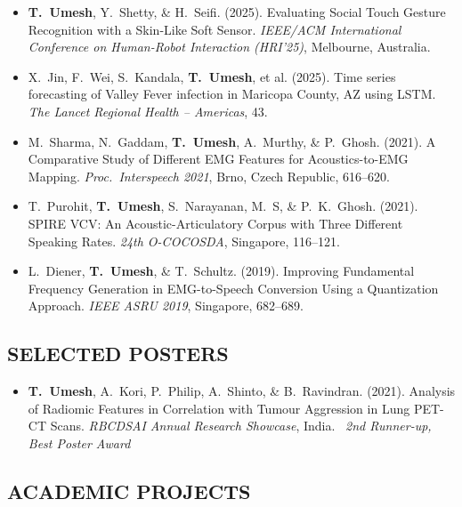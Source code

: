 \documentclass[a4paper, 11pt]{article}
\begin{document}
{\begin{itemize}[nosep]
  \item \textbf{T.\ Umesh}, Y.\ Shetty, \& H.\ Seifi. (2025). Evaluating Social Touch Gesture Recognition with a Skin-Like Soft Sensor. \textit{IEEE/ACM International Conference on Human-Robot Interaction (HRI'25)}, Melbourne, Australia.
  \item X.\ Jin, F.\ Wei, S.\ Kandala, \textbf{T.\ Umesh}, et al. (2025). Time series forecasting of Valley Fever infection in Maricopa County, AZ using LSTM. \textit{The Lancet Regional Health -- Americas}, 43.
  \item M.\ Sharma, N.\ Gaddam, \textbf{T.\ Umesh}, A.\ Murthy, \& P.\ Ghosh. (2021). A Comparative Study of Different EMG Features for Acoustics-to-EMG Mapping. \textit{Proc.\ Interspeech 2021}, Brno, Czech Republic, 616--620.
  \item T.\ Purohit, \textbf{T.\ Umesh}, S.\ Narayanan, M.\ S, \& P.\ K.\ Ghosh. (2021). SPIRE VCV: An Acoustic-Articulatory Corpus with Three Different Speaking Rates. \textit{24th O-COCOSDA}, Singapore, 116--121.
  \item L.\ Diener, \textbf{T.\ Umesh}, \& T.\ Schultz. (2019). Improving Fundamental Frequency Generation in EMG-to-Speech Conversion Using a Quantization Approach. \textit{IEEE ASRU 2019}, Singapore, 682--689.
\end{itemize}

\smallskip

\subsection{SELECTED POSTERS}
\vspace{2pt}

\begin{itemize}[nosep]
  \item \textbf{T.\ Umesh}, A.\ Kori, P.\ Philip, A.\ Shinto, \& B.\ Ravindran. (2021). Analysis of Radiomic Features in Correlation with Tumour Aggression in Lung PET-CT Scans. \textit{RBCDSAI Annual Research Showcase}, India. \faMedal~\textit{2nd Runner-up, Best Poster Award}
\end{itemize}

\smallskip

\subsection{ACADEMIC PROJECTS}
\vspace{2pt}

}
\end{document}
